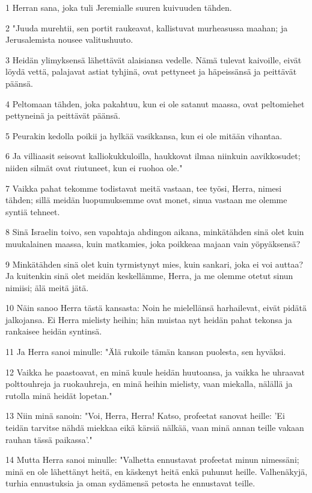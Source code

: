 \par 1 Herran sana, joka tuli Jeremialle suuren kuivuuden tähden.
\par 2 "Juuda murehtii, sen portit raukeavat, kallistuvat murheasussa maahan; ja Jerusalemista nousee valitushuuto.
\par 3 Heidän ylimyksensä lähettävät alaisiansa vedelle. Nämä tulevat kaivoille, eivät löydä vettä, palajavat astiat tyhjinä, ovat pettyneet ja häpeissänsä ja peittävät päänsä.
\par 4 Peltomaan tähden, joka pakahtuu, kun ei ole satanut maassa, ovat peltomiehet pettyneinä ja peittävät päänsä.
\par 5 Peurakin kedolla poikii ja hylkää vasikkansa, kun ei ole mitään vihantaa.
\par 6 Ja villiaasit seisovat kalliokukkuloilla, haukkovat ilmaa niinkuin aavikkosudet; niiden silmät ovat riutuneet, kun ei ruohoa ole."
\par 7 Vaikka pahat tekomme todistavat meitä vastaan, tee työsi, Herra, nimesi tähden; sillä meidän luopumuksemme ovat monet, sinua vastaan me olemme syntiä tehneet.
\par 8 Sinä Israelin toivo, sen vapahtaja ahdingon aikana, minkätähden sinä olet kuin muukalainen maassa, kuin matkamies, joka poikkeaa majaan vain yöpyäksensä?
\par 9 Minkätähden sinä olet kuin tyrmistynyt mies, kuin sankari, joka ei voi auttaa? Ja kuitenkin sinä olet meidän keskellämme, Herra, ja me olemme otetut sinun nimiisi; älä meitä jätä.
\par 10 Näin sanoo Herra tästä kansasta: Noin he mielellänsä harhailevat, eivät pidätä jalkojansa. Ei Herra mielisty heihin; hän muistaa nyt heidän pahat tekonsa ja rankaisee heidän syntinsä.
\par 11 Ja Herra sanoi minulle: "Älä rukoile tämän kansan puolesta, sen hyväksi.
\par 12 Vaikka he paastoavat, en minä kuule heidän huutoansa, ja vaikka he uhraavat polttouhreja ja ruokauhreja, en minä heihin mielisty, vaan miekalla, nälällä ja rutolla minä heidät lopetan."
\par 13 Niin minä sanoin: "Voi, Herra, Herra! Katso, profeetat sanovat heille: 'Ei teidän tarvitse nähdä miekkaa eikä kärsiä nälkää, vaan minä annan teille vakaan rauhan tässä paikassa'."
\par 14 Mutta Herra sanoi minulle: "Valhetta ennustavat profeetat minun nimessäni; minä en ole lähettänyt heitä, en käskenyt heitä enkä puhunut heille. Valhenäkyjä, turhia ennustuksia ja oman sydämensä petosta he ennustavat teille.
